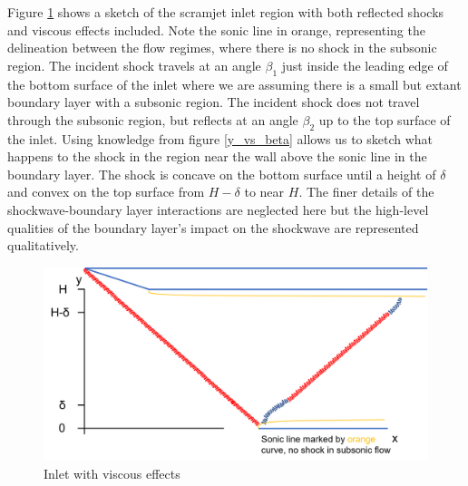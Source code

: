 \documentclass[../main.tex]{subfiles}
\begin{document}
Figure \ref{viscous_inlet} shows a sketch of the scramjet inlet region with both reflected shocks and viscous effects included.
Note the sonic line in orange, representing the delineation between the flow regimes, where there is no shock in the subsonic region.
The incident shock travels at an angle \(\beta_1\) just inside the leading edge of the bottom surface of the inlet where we are assuming there is a small but extant boundary layer with a subsonic region.
The incident shock does not travel through the subsonic region, but reflects at an angle \(\beta_2\) up to the top surface of the inlet.
Using knowledge from figure \ref{y_vs_beta} allows us to sketch what happens to the shock in the region near the wall above the sonic line in the boundary layer.
The shock is concave on the bottom surface until a height of \(\delta\) and convex on the top surface from \(H-\delta\) to near \(H\).
The finer details of the shockwave-boundary layer interactions are neglected here but the high-level qualities of the boundary layer's impact on the shockwave are represented qualitatively.


 
\begin{figure}[h!]
    \centering
    \includegraphics[scale=0.7]{../../images/problem_3/shock_inlet.png}
    \caption{Inlet with viscous effects}
    \label{viscous_inlet}
\end{figure}
\end{document}
